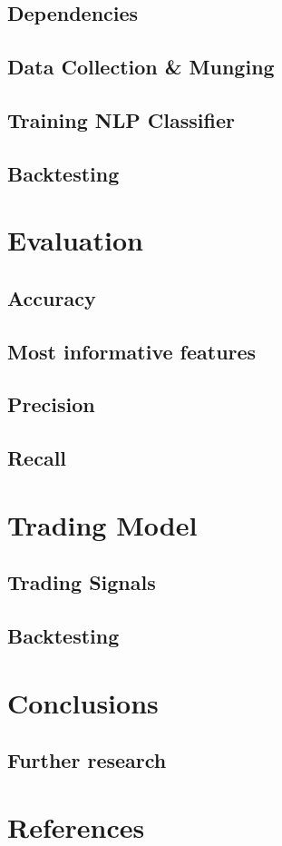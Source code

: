 \documentclass[twocolumn]{article}
\begin{document}
\subsection{Dependencies}
\subsection{Data Collection \& Munging}
\subsection{Training NLP Classifier}
\subsection{Backtesting}
\section{Evaluation}
\subsection{Accuracy}

\subsection{Most informative features}

\subsection{Precision}

\subsection{Recall}

\section{Trading Model}
\subsection{Trading Signals}
\subsection{Backtesting}
\section{Conclusions}
\subsection{Further research}

\section{References}
\end{document}
